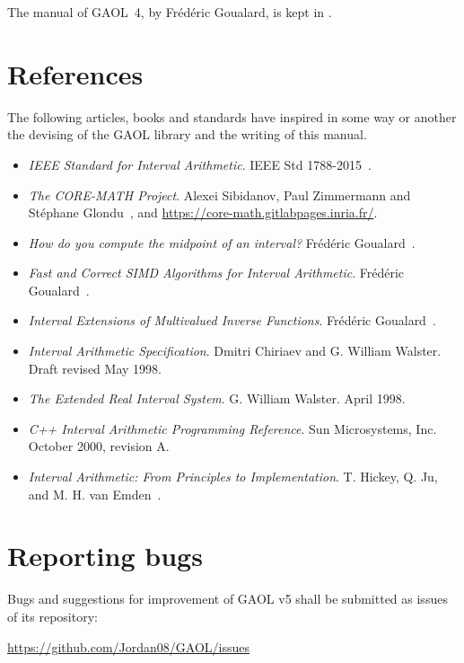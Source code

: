 \documentclass[12pt,a4paper,twoside,openright]{book}
\begin{document}
\noindent
The manual of GAOL~4, by Fr\'ed\'eric Goualard, is kept in .

\section{References}

The following articles, books and standards have inspired in some way or
another the devising of the GAOL library and the writing of this manual.

\begin{itemize}
\item \emph{IEEE Standard for Interval Arithmetic}. IEEE Std
  1788-2015~\cite{IEEE1788:2015}.
\item \emph{The CORE-MATH Project}. Alexei Sibidanov, Paul Zimmermann and
  St\'ephane Glondu~\cite{CoreMath:2022}, and
  \url{https://core-math.gitlabpages.inria.fr/}.
\item \emph{How do you compute the midpoint of an interval?} Fr\'ed\'eric
  Goualard~\cite{Goualard:TOMS2014}.
\item \emph{Fast and Correct SIMD Algorithms for Interval Arithmetic}.
  Fr\'ed\'eric Goualard~\cite{Goualard:PARA08}.
\item \emph{Interval Extensions of Multivalued Inverse Functions}.
  Fr\'ed\'eric Goualard~\cite{Goualard:2008}.
\item \emph{Interval Arithmetic Specification}. Dmitri Chiriaev and G.\:
  William Walster. Draft revised May 1998.
\item \emph{The Extended Real Interval System}. G.\: William Walster. April
  1998.
\item \emph{C++ Interval Arithmetic Programming Reference}. Sun Microsystems,
  Inc. October 2000, revision A.
\item \emph{Interval Arithmetic: From Principles to Implementation}. T.\:
  Hickey, Q.\: Ju, and M.\: H.\: van Emden~\cite{Hickey-Ju-vanEmden:2001}.
\end{itemize}

\section{Reporting bugs}

Bugs and suggestions for improvement of GAOL v5 shall be submitted as issues
of its repository:

\begin{center}
  \url{https://github.com/Jordan08/GAOL/issues}
\end{center}
\end{document}
